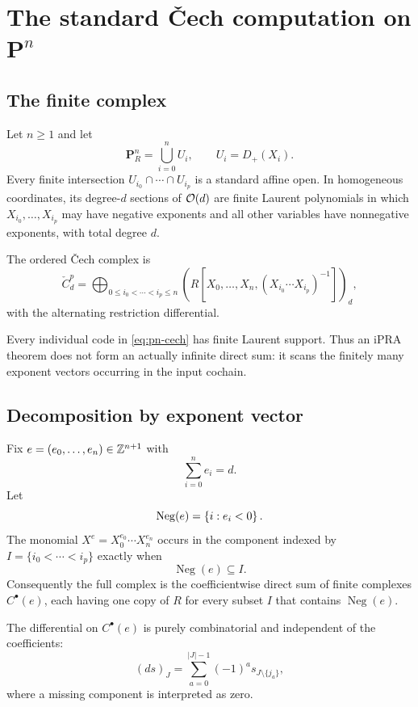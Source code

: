 \section{The standard \v{C}ech computation on \texorpdfstring{$\mathbf P^n$}{Pn}}

\subsection{The finite complex}

Let $n\geq1$ and let
\[
           \mathbf P^n_R=\bigcup_{i=0}^{n}U_i,
           \qquad U_i=D_+(X_i).
\]
Every finite intersection $U_{i_0}\cap\cdots\cap U_{i_p}$ is a standard affine open.  In homogeneous
coordinates, its degree-$d$ sections of $\mathcal O(d)$ are finite Laurent polynomials in which
$X_{i_0},\ldots,X_{i_p}$ may have negative exponents and all other variables have nonnegative
exponents, with total degree $d$.

The ordered \v{C}ech complex is
\begin{equation}\label{eq:pn-cech}
 \check C^p_d=\bigoplus_{0\leq i_0<\cdots<i_p\leq n}
 \left(R[X_0,\ldots,X_n,(X_{i_0}\cdots X_{i_p})^{-1}]\right)_d,
\end{equation}
with the alternating restriction differential.

Every individual code in \eqref{eq:pn-cech} has finite Laurent support.  Thus an iPRA theorem does
not form an actually infinite direct sum: it scans the finitely many exponent vectors occurring in
the input cochain.

\subsection{Decomposition by exponent vector}

Fix $e=(e_0,\ldots,e_n)\in\mathbb Z^{n+1}$ with
\[
                            \sum_{i=0}^{n}e_i=d.
\]
Let
\[
                     \operatorname{Neg}(e)=\left\{i:e_i<0\right\}.
\]
The monomial $X^e=X_0^{e_0}\cdots X_n^{e_n}$ occurs in the component indexed by
$I=\{i_0<\cdots<i_p\}$ exactly when
\[
                       \operatorname{Neg}(e)\subseteq I.
\]
Consequently the full complex is the coefficientwise direct sum of finite complexes
$C^\bullet(e)$, each having one copy of $R$ for every subset $I$ that contains
$\operatorname{Neg}(e)$.

The differential on $C^\bullet(e)$ is purely combinatorial and independent of the coefficients:
\[
       (ds)_J=\sum_{a=0}^{|J|-1}(-1)^a s_{J\setminus\{j_a\}},
\tag{12.1}
\]
where a missing component is interpreted as zero.

